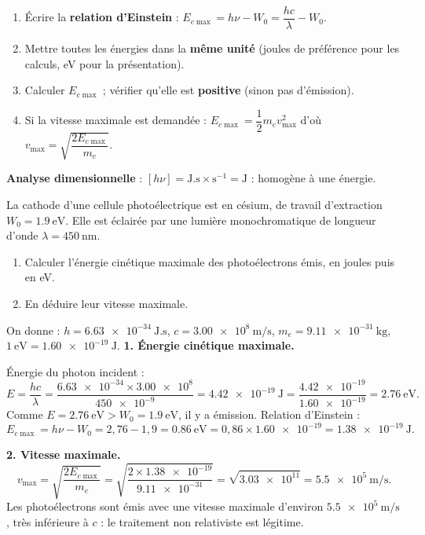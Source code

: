 \documentclass[11pt]{article}
\begin{document}
\begin{methode}
\begin{enumerate}
\item Écrire la \textbf{relation d'Einstein} : $E_{c\max} = h\nu - W_0 = \dfrac{hc}{\lambda} - W_0$.
\item Mettre toutes les énergies dans la \textbf{même unité} (joules de préférence pour les calculs, eV pour la présentation).
\item Calculer $E_{c\max}$ ; vérifier qu'elle est \textbf{positive} (sinon pas d'émission).
\item Si la vitesse maximale est demandée : $E_{c\max} = \dfrac{1}{2}m_e v_{\max}^2$ d'où $v_{\max} = \sqrt{\dfrac{2E_{c\max}}{m_e}}$.
\end{enumerate}
\textbf{Analyse dimensionnelle} : $[h\nu] = \text{J.s} \times \text{s}^{-1} = \text{J}$ : homogène à une énergie.
\end{methode}

\begin{exoresolu}
La cathode d'une cellule photoélectrique est en césium, de travail d'extraction $W_0 = \num{1,9}\ \text{eV}$. Elle est éclairée par une lumière monochromatique de longueur d'onde $\lambda = \num{450}\ \text{nm}$.
\begin{enumerate}
\item Calculer l'énergie cinétique maximale des photoélectrons émis, en joules puis en eV.
\item En déduire leur vitesse maximale.
\end{enumerate}
On donne : $h = \num{6,63e-34}\ \text{J.s}$, $c = \num{3,00e8}\ \text{m/s}$, $m_e = \num{9,11e-31}\ \text{kg}$, $1\ \text{eV} = \num{1,60e-19}\ \text{J}$.
\tcblower
\textbf{1. Énergie cinétique maximale.}

Énergie du photon incident :
\[ E = \frac{hc}{\lambda} = \frac{\num{6,63e-34} \times \num{3,00e8}}{\num{450e-9}} = \num{4,42e-19}\ \text{J} = \frac{\num{4,42e-19}}{\num{1,60e-19}} = \num{2,76}\ \text{eV}. \]
Comme $E = \num{2,76}\ \text{eV} > W_0 = \num{1,9}\ \text{eV}$, il y a émission. Relation d'Einstein :
\[ E_{c\max} = h\nu - W_0 = 2{,}76 - 1{,}9 = \num{0,86}\ \text{eV} = 0{,}86 \times \num{1,60e-19} = \num{1,38e-19}\ \text{J}. \]

\textbf{2. Vitesse maximale.}
\[ v_{\max} = \sqrt{\frac{2E_{c\max}}{m_e}} = \sqrt{\frac{2 \times \num{1,38e-19}}{\num{9,11e-31}}} = \sqrt{\num{3,03e11}} = \num{5,5e5}\ \text{m/s}. \]
Les photoélectrons sont émis avec une vitesse maximale d'environ $\num{5,5e5}\ \text{m/s}$, très inférieure à $c$ : le traitement non relativiste est légitime.
\end{exoresolu}
\end{document}

